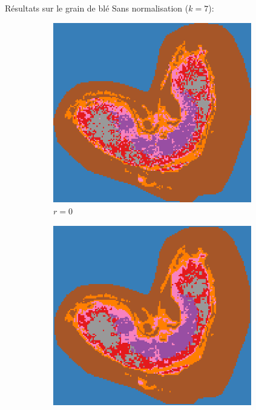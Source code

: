 \documentclass[10pt]{beamer}
\begin{document}
\begin{frame}{Résultats sur le grain de blé}
  \vspace{-0.2cm}
  Sans normalisation ($k=7$):

  \begin{figure}[ht]
    \centering
    \begin{subfigure}[t]{0.25\textwidth}
      \centering
      \includegraphics[width=0.95\textwidth]{fig/peaksel_prominence75_r0_full_colors}
      \caption{$r=0$}
      \label{subfig:peaksel_prominence75_r0_full_colors}
    \end{subfigure}%
    \begin{subfigure}[t]{0.25\textwidth}
      \centering
      \includegraphics[width=0.95\textwidth]{fig/peaksel_prominence75_r1_full_colors}

\end{subfigure}
\end{figure}
\end{frame}
\end{document}
